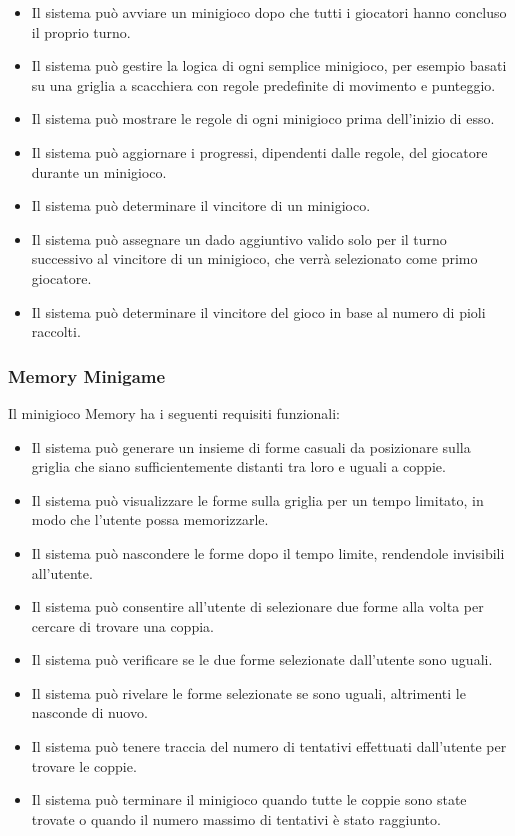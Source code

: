 \begin{itemize}
      \item Il sistema può avviare un minigioco dopo che tutti i giocatori hanno concluso
            il proprio turno.
      \item Il sistema può gestire la logica di ogni semplice minigioco, per esempio 
            basati su una griglia a scacchiera con regole predefinite di movimento e punteggio.
      \item Il sistema può mostrare le regole di ogni minigioco prima dell'inizio di esso.
      \item Il sistema può aggiornare i progressi, dipendenti dalle regole, del giocatore 
            durante un minigioco.
      \item Il sistema può determinare il vincitore di un minigioco.
      \item Il sistema può assegnare un dado aggiuntivo valido solo per il turno successivo al
            vincitore di un minigioco, che verrà selezionato come primo giocatore.
      \item Il sistema può determinare il vincitore del gioco in base al numero di pioli raccolti.
\end{itemize}

\subsubsection{Memory Minigame} \label{sec:functional-requirements:memory}
Il minigioco Memory ha i seguenti requisiti funzionali:
\begin{itemize}
      \item Il sistema può generare un insieme di forme casuali da posizionare sulla griglia che siano 
            sufficientemente distanti tra loro e uguali a coppie.
      \item Il sistema può visualizzare le forme sulla griglia per un tempo limitato, in modo che l'utente
            possa memorizzarle.
      \item Il sistema può nascondere le forme dopo il tempo limite, rendendole invisibili all'utente.
      \item Il sistema può consentire all'utente di selezionare due forme alla volta
            per cercare di trovare una coppia.
      \item Il sistema può verificare se le due forme selezionate dall'utente sono uguali.
      \item Il sistema può rivelare le forme selezionate se sono uguali, altrimenti le nasconde di nuovo.
      \item Il sistema può tenere traccia del numero di tentativi effettuati dall'utente per trovare le coppie.
      \item Il sistema può terminare il minigioco quando tutte le coppie sono state trovate o quando il numero massimo di tentativi
            è stato raggiunto.
\end{itemize}